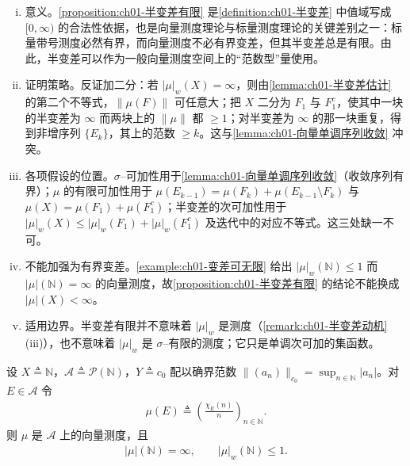 \documentclass[../../main.tex]{subfiles}%
\begin{document}
\begin{remark}\label{remark:ch01-半变差有限注}
\begin{enumerate}[(i)]
\item 意义。\cref{proposition:ch01-半变差有限} 是\cref{definition:ch01-半变差} 中值域写成 $[0,\infty)$ 的合法性依据，也是向量测度理论与标量测度理论的关键差别之一：标量带号测度必然有界，而向量测度不必有界变差，但其半变差总是有限。由此，半变差可以作为一般向量测度空间上的“范数型”量使用。
\item 证明策略。反证加二分：若 $|\mu|_w(X)=\infty$，则由\cref{lemma:ch01-半变差估计} 的第二个不等式，$\|\mu(F)\|$ 可任意大；把 $X$ 二分为 $F_1$ 与 $F_1^c$，使其中一块的半变差为 $\infty$ 而两块上的 $\|\mu\|$ 都 $\geqslant1$；对半变差为 $\infty$ 的那一块重复，得到非增序列 $\{E_k\}$，其上的范数 $\geqslant k$。这与\cref{lemma:ch01-向量单调序列收敛} 冲突。
\item 各项假设的位置。$\sigma$--可加性用于\cref{lemma:ch01-向量单调序列收敛}（收敛序列有界）；$\mu$ 的有限可加性用于 $\mu(E_{k-1})=\mu(F_k)+\mu(E_{k-1}\setminus F_k)$ 与 $\mu(X)=\mu(F_1)+\mu(F_1^c)$；半变差的次可加性用于 $|\mu|_w(X)\leqslant|\mu|_w(F_1)+|\mu|_w(F_1^c)$ 及迭代中的对应不等式。这三处缺一不可。
\item 不能加强为有界变差。\cref{example:ch01-变差可无限} 给出 $|\mu|_w(\mathbb{N})\leqslant1$ 而 $|\mu|(\mathbb{N})=\infty$ 的向量测度，故\cref{proposition:ch01-半变差有限} 的结论不能换成 $|\mu|(X)<\infty$。
\item 适用边界。半变差有限并不意味着 $|\mu|_w$ 是测度（\cref{remark:ch01-半变差动机}(iii)），也不意味着 $|\mu|_w$ 是 $\sigma$--有限的测度；它只是单调次可加的集函数。
\end{enumerate}
\end{remark}

\begin{example}\label{example:ch01-变差可无限}
设 $X\triangleq\mathbb{N}$，$\mathcal{A}\triangleq\mathcal{P}(\mathbb{N})$，$Y\triangleq c_0$ 配以确界范数 $\|(a_n)\|_{c_0}=\sup_{n\in\mathbb{N}}|a_n|$。对 $E\in\mathcal{A}$ 令
\begin{align}
\mu(E)\triangleq\left(\frac{\chi_E(n)}{n}\right)_{n\in\mathbb{N}}. \label{align:ch01-变差可无限定义}
\end{align}
则 $\mu$ 是 $\mathcal{A}$ 上的向量测度，且
\begin{align}
|\mu|(\mathbb{N})=\infty,\qquad |\mu|_w(\mathbb{N})\leqslant1. \label{align:ch01-变差可无限结论}
\end{align}
\end{example}
\end{document}
